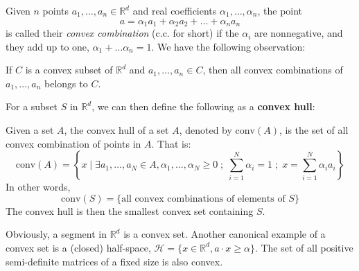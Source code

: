 Given $n$ points $a_{1},\dots,a_{n}\in \mathbb{R}^{d}$ and real coefficients $\alpha_{1},\dots,\alpha_{n}$, the point \begin{equation}
    a= \alpha_{1}a_{1} + \alpha_{2}a_{2} + \dots + \alpha_{n} a_{n}
\end{equation}
is called their \textit{convex combination} (c.c. for short) if the $\alpha_{i}$ are nonnegative, and they add up to one, $\alpha_{1}+\dots\alpha_{n}=1$. We have the following observation: 
\begin{lemma}
    If $C$ is a convex subset of $\mathbb{R}^{d}$ and $a_{1},\dots,a_{n}\in C$, then all convex combinations of $a_{1},\dots,a_{n}$ belongs to $C$. 
\end{lemma}
For a subset $S$ in $\mathbb{R}^{d}$, we can then define the following as a \textbf{convex hull}:
\begin{definition}
    Given a set $A$, the convex hull of a set $A$, denoted by $\mathrm{conv}(A)$, is the set of all convex combination of points in $A$. That is: 
    \begin{equation}
        \mathrm{conv}(A) = \left\{ x \mid \exists a_{1},\dots,a_{N}\in A, \alpha_{1},\dots,\alpha_{N}\geq 0\; ;\; \sum^{N}_{i=1}\alpha_{i} = 1\; ;\;  x= \sum^{N}_{i=1}\alpha_{i} a_{i} \right\}
    \end{equation}
    In other words, 
    \begin{equation}
        \mathrm{conv}(S) = \{\text{all convex combinations of elements of }S\}
    \end{equation}
    The convex hull is then the smallest convex set containing $S$. 
\end{definition}

Obviously, a segment in $\mathbb{R}^{d}$ is a convex set. Another canonical example of a convex set is a (closed) half-space, $\mathcal{H}= \{x\in \mathbb{R}^{d}, a\cdot x \geq \alpha\}$. The set of all positive semi-definite matrices of a fixed size is also convex. 

